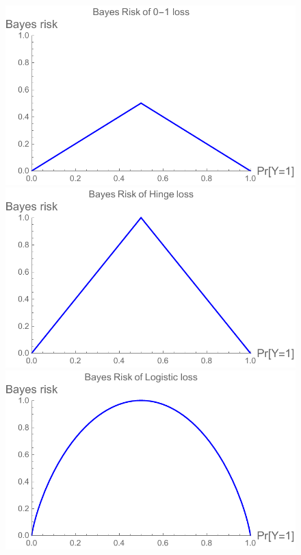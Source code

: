 \documentclass[twoside,11pt]{article}
\begin{document}
\begin{figure}
	\begin{minipage}{0.3\linewidth}
	\centering
	\includegraphics[width=0.95\linewidth]{figs/0-1-br.pdf}
	\end{minipage}
	\hfill
	\begin{minipage}{0.3\linewidth}
	\centering		\includegraphics[width=0.95\linewidth]{figs/hinge-br.pdf}
	\end{minipage}
	\hfill
	\begin{minipage}{0.3\linewidth}
	\centering
	\includegraphics[width=0.95\linewidth]{figs/logistic-br.pdf}

\end{minipage}
\end{figure}
\end{document}
